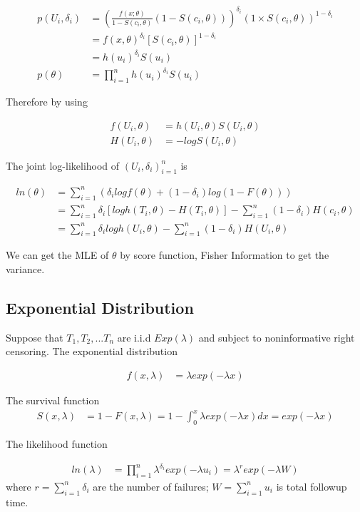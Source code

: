 \documentclass[11pt]{article} %
\begin{document}
\begin{align*}
	p(U_i, \delta_i) & = \left(\frac{f(x; \theta)}{1- S(c_i, \theta)} (1- S(c_i, \theta)) \right)^{\delta_i} \left(1 \times S(c_i, \theta) \right)^{1-\delta_i} \\
		&=f(x, \theta)^{\delta_i} [S(c_i, \theta)]^{1-\delta_i}\\
		&= h(u_i)^{\delta_i} S(u_i)\\
	p(\theta) &= \prod_{i=1}^n h(u_i)^{\delta_i} S(u_i)
\end{align*}

	
Therefore by using

\begin{align*}
	f(U_i, \theta) & = h(U_i, \theta) S(U_i, \theta) \\
	H(U_i, \theta) &= -log S(U_i, \theta)
\end{align*}

The joint log-likelihood of ${(U_i, \delta_i)}_{i=1}^n$ is

\begin{align*}
	ln(\theta) & = \sum_{i=1}^n \left(\delta_i log f(\theta) + (1-\delta_i) log (1- F(\theta)) \right) \\
	&= \sum_{i=1}^n \delta_i \left[log h(T_i, \theta) - H(T_i, \theta) \right] - \sum_{i=1}^n  (1-\delta_i) H(c_i, \theta)  \\
	&= \sum_{i=1}^n \delta_i log h(U_i, \theta) - \sum_{i=1}^n  (1-\delta_i) H(U_i,  \theta)
\end{align*}

We can get the MLE of $\theta$ by score function, Fisher Information to get the variance. 

\subsection{Exponential Distribution}
Suppose that $T_1, T_2, ... T_n$ are i.i.d $Exp(\lambda)$ and subject to noninformative right censoring. The exponential distribution

\begin{align*}
	f(x, \lambda) & = \lambda exp(-\lambda x)
\end{align*}

The survival function
\begin{align*}
	S(x, \lambda) & = 1- F(x, \lambda) =1- \int_{0}^x \lambda exp(-\lambda x) dx = exp(-\lambda x)
\end{align*}

The likelihood function

\begin{align*}
	ln(\lambda) & = \prod_{i=1}^n \lambda^{\delta_i} exp(-\lambda u_i) = \lambda^r exp(-\lambda W)
\end{align*}
where $r = \sum_{i=1}^n \delta_i$ are the number of failures; $W=\sum_{i=1}^n u_i$ is total followup time.
\end{document}

